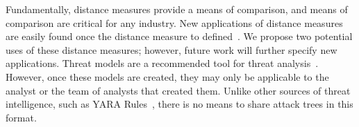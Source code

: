 Fundamentally, distance measures provide a means of comparison, and means of comparison are critical for any industry. New applications of distance measures are easily found once the distance measure to defined~\cite{beham2011new}. We propose two potential uses of these distance measures; however, future work will further specify new applications. Threat models are a recommended tool for threat analysis~\cite{andersonSecurityEngineeringGuide2020,schneierSecretsLiesDigital2000}. However, once these models are created, they may only be applicable to the analyst or the team of analysts that created them. Unlike other sources of threat intelligence, such as YARA Rules~\cite{naik2019cyberthreat,naik2020evaluating}, there is no means to share attack trees in this format.